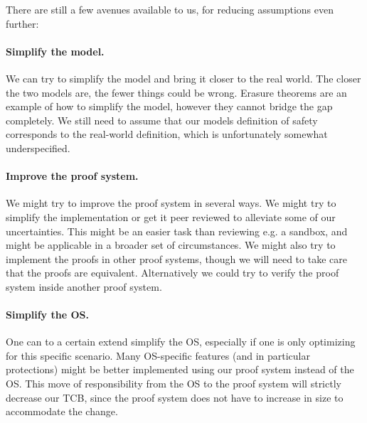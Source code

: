 There are still a few avenues available to us, for reducing assumptions even
further:

\paragraph{Simplify the model.} We can try to simplify the model and bring it
closer to the real world. The closer the two models are, the fewer things could
be wrong. Erasure theorems are an example of how to simplify the model, however
they cannot bridge the gap completely. We still need to assume that our models
definition of safety corresponds to the real-world definition, which is
unfortunately somewhat underspecified.

\paragraph{Improve the proof system.} We might try to improve the proof system
in several ways. We might try to simplify the implementation or get it peer
reviewed to alleviate some of our uncertainties. This might be an easier task
than reviewing e.g. a sandbox, and might be applicable in a broader set of
circumstances. We might also try to implement the proofs in other proof systems,
though we will need to take care that the proofs are equivalent. Alternatively
we could try to verify the proof system inside another proof system.

\paragraph{Simplify the OS.} One can to a certain extend simplify the OS,
especially if one is only optimizing for this specific scenario. Many
OS-specific features (and in particular protections) might be better implemented
using our proof system instead of the OS. This move of responsibility from the
OS to the proof system will strictly decrease our TCB, since the proof system
does not have to increase in size to accommodate the change.
